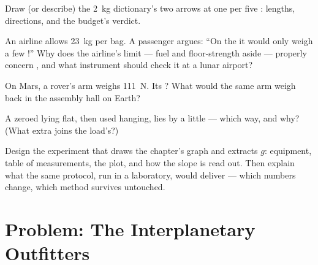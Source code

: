 \begin{exercise}[$\star$]\label{exo:g9:weight-vs-mass:8}
Draw (or describe) the \qty{2}{kg} dictionary's two 
arrows at one  per five : lengths,
directions, and the budget's verdict.
\end{exercise}

\begin{exercise}[$\star\star$]\label{exo:g9:weight-vs-mass:9}
An airline allows \qty{23}{kg} per bag. A passenger argues:
``On the  it would only weigh a few !'' Why does
the airline's limit --- fuel and floor-strength aside ---
properly concern , and what instrument should check it
at a lunar airport?
\end{exercise}

\begin{exercise}[$\star\star$]\label{exo:g9:weight-vs-mass:10}
On Mars, a rover's arm weighs \qty{111}{N}. Its ? What
would the same arm weigh back in the assembly hall on
Earth?
\end{exercise}

\begin{exercise}[$\star\star$]\label{exo:g9:weight-vs-mass:11}
A  zeroed lying flat, then used hanging, lies by
a little --- which way, and why? (What extra  joins
the load's?)
\end{exercise}

\begin{exercise}[$\star\star\star$]\label{exo:g9:weight-vs-mass:12}
Design the experiment that draws the chapter's graph and
extracts $g$: equipment, table of measurements, the plot,
and how the slope is read out. Then explain what the same
protocol, run in a  laboratory, would deliver ---
which numbers change, which method survives untouched.
\end{exercise}

\section{Problem: The Interplanetary Outfitters}

